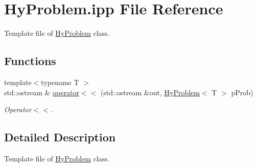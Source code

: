 \hypertarget{HyProblem_8ipp}{
\section{HyProblem.ipp File Reference}
\label{HyProblem_8ipp}
}


Template file of \hyperlink{classHyProblem}{HyProblem} class.  


\subsection*{Functions}
\begin{DoxyCompactItemize}
\item 
\hypertarget{HyProblem_8ipp_a8fd64b28fcc0373b7b3b045601bedc66}{
{\footnotesize template$<$typename T $>$ }\\std::ostream \& \hyperlink{HyProblem_8ipp_a8fd64b28fcc0373b7b3b045601bedc66}{operator$<$$<$} (std::ostream \&out, \hyperlink{classHyProblem}{HyProblem}$<$ T $>$ pProb)}
\label{HyProblem_8ipp_a8fd64b28fcc0373b7b3b045601bedc66}

\begin{DoxyCompactList}\small\item\em Operator$<$$<$. \item\end{DoxyCompactList}\end{DoxyCompactItemize}


\subsection{Detailed Description}
Template file of \hyperlink{classHyProblem}{HyProblem} class. 